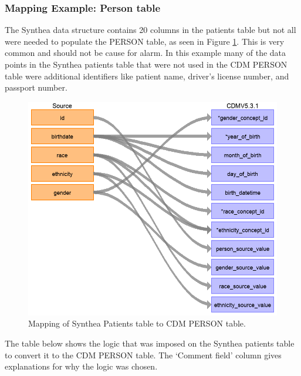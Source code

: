 \documentclass[11pt]{book}
\theoremstyle{definition}
\theoremstyle{definition}
\theoremstyle{definition}
\theoremstyle{remark}
\begin{document}
\hypertarget{mapping-example-person-table}{%
\subsubsection{Mapping Example: Person table}\label{mapping-example-person-table}}

The Synthea data structure contains 20 columns in the patients table but not all were needed to populate the PERSON table, as seen in Figure \ref{fig:syntheaPerson}. This is very common and should not be cause for alarm. In this example many of the data points in the Synthea patients table that were not used in the CDM PERSON table were additional identifiers like patient name, driver's license number, and passport number.

\begin{figure}
\includegraphics[width=1\linewidth]{images/ExtractTransformLoad/syntheaPersonTable} \caption{Mapping of Synthea Patients table to CDM PERSON table.}\label{fig:syntheaPerson}
\end{figure}

The table below shows the logic that was imposed on the Synthea patients table to convert it to the CDM PERSON table. The `Comment field' column gives explanations for why the logic was chosen.
\end{document}
